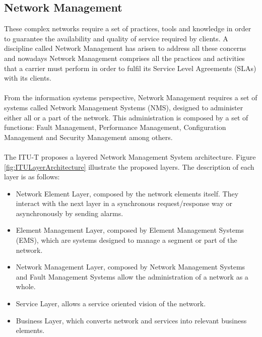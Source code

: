 \documentclass[10pt,a4paper]{article}
\begin{document}
 \subsection{Network Management}
 These complex networks require a set of practices, tools and knowledge in order to guarantee the availability and quality of service required by clients. A discipline called Network Management has arisen to address all these concerns and nowadays Network Management comprises all the practices and activities that a carrier must perform in order to fulfil its Service Level Agreements (SLAs) with its clients\cite{networkMgmtFund}.
 \\\\
 From the information systems perspective, Network Management requires a set of systems called Network Management Systems (NMS), designed to administer either all or a part of the network. This administration is composed by a set of functions: Fault Management, Performance Management, Configuration Management and Security Management among others\cite{ITU3010}.
 \\\\
The ITU-T proposes a layered Network Management System architecture. Figure \ref{fig:ITULayerArchitecture} illustrate the proposed layers. The description of each layer is as follows\cite{ITU3010}: 

\begin{itemize}
\item Network Element Layer, composed by the network elements itself. They interact with the next layer in a synchronous request/response way or asynchronously by sending alarms.
\item Element Management Layer, composed by Element Management Systems (EMS), which are systems designed to manage a segment or part of the network.
\item Network Management Layer, composed by Network Management Systems and Fault Management Systems allow the administration of a network as a whole.
\item Service Layer, allows a service oriented vision of the network.
\item Business Layer, which converts network and services into relevant business elements.
\end{itemize}
\end{document}

